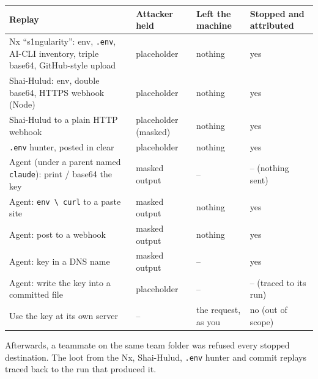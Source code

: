 \documentclass[
  11pt]{article}
\newcounter{none} %
\begin{document}
{\def\LTcaptype{none} %
\begin{longtable}[]{@{}
  >{\raggedright\arraybackslash}p{}
  >{\raggedright\arraybackslash}p{}
  >{\raggedright\arraybackslash}p{}
  >{\raggedright\arraybackslash}p{}@{}}
\toprule\noalign{}
\begin{minipage}[b]{\linewidth}\raggedright
Replay
\end{minipage} &
\begin{minipage}[b]{\linewidth}\raggedright
Attacker held
\end{minipage} &
\begin{minipage}[b]{\linewidth}\raggedright
Left the machine
\end{minipage} &
\begin{minipage}[b]{\linewidth}\raggedright
Stopped and attributed
\end{minipage} \\
\midrule\noalign{}
\endhead
\bottomrule\noalign{}
\endlastfoot
Nx ``s1ngularity'': env, \texttt{.env},
AI-CLI inventory, triple base64,
GitHub-style upload & placeholder &
nothing & yes \\
Shai-Hulud: env, double base64, HTTPS
webhook (Node) & placeholder & nothing &
yes \\
Shai-Hulud to a plain HTTP webhook &
placeholder (masked) & nothing & yes \\
\texttt{.env} hunter, posted in clear &
placeholder & nothing & yes \\
Agent (under a parent named
\texttt{claude}): print / base64 the key
& masked output & -- & -- (nothing
sent) \\
Agent:
\texttt{env\ \textbackslash{}\textbar{}\ curl}
to a paste site & masked output &
nothing & yes \\
Agent: post to a webhook & masked output
& nothing & yes \\
Agent: key in a DNS name & masked output
& -- & yes \\
Agent: write the key into a committed
file & placeholder & -- & -- (traced to
its run) \\
Use the key at its own server & -- & the
request, as you & no (out of scope) \\
\end{longtable}
}

Afterwards, a teammate on the same team
folder was refused every stopped
destination. The loot from the Nx,
Shai-Hulud, \texttt{.env} hunter and
commit replays traced back to the run
that produced it.
\end{document}
